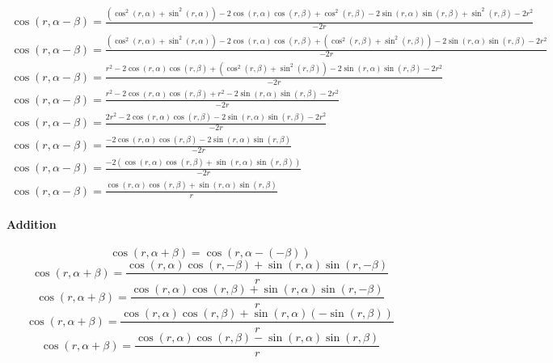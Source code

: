 \documentclass[a4paper,12pt]{report}
\begin{document}
\begin{landscape}
{\begin{gather}
\cos(r,\alpha - \beta) = \frac{\left(\cos^2(r,\alpha) + \sin^2(r,\alpha)\right) - 2 \cos(r,\alpha) \cos(r,\beta) + \cos^2(r,\beta) - 2 \sin(r,\alpha) \sin(r,\beta) + \sin^2(r,\beta) - 2r^2}{-2r} \\
\cos(r,\alpha - \beta) = \frac{\left(\cos^2(r,\alpha) + \sin^2(r,\alpha)\right) - 2 \cos(r,\alpha) \cos(r,\beta) + \left(\cos^2(r,\beta) + \sin^2(r,\beta)\right) - 2 \sin(r,\alpha) \sin(r,\beta) - 2r^2}{-2r} \\
\cos(r,\alpha - \beta) = \frac{r^2 - 2 \cos(r,\alpha) \cos(r,\beta) + \left(\cos^2(r,\beta) + \sin^2(r,\beta)\right) - 2 \sin(r,\alpha) \sin(r,\beta) - 2r^2}{-2r} \\
\cos(r,\alpha - \beta) = \frac{r^2 - 2 \cos(r,\alpha) \cos(r,\beta) + r^2 - 2 \sin(r,\alpha) \sin(r,\beta) - 2r^2}{-2r} \\
\cos(r,\alpha - \beta) = \frac{2r^2 - 2 \cos(r,\alpha) \cos(r,\beta) - 2 \sin(r,\alpha) \sin(r,\beta) - 2r^2}{-2r} \\
\cos(r,\alpha - \beta) = \frac{-2 \cos(r,\alpha) \cos(r,\beta) - 2 \sin(r,\alpha) \sin(r,\beta)}{-2r} \\
\cos(r,\alpha - \beta) = \frac{-2 \left(\cos(r,\alpha) \cos(r,\beta) + \sin(r,\alpha) \sin(r,\beta)\right)}{-2r} \\
\cos(r,\alpha - \beta) = \frac{\cos(r,\alpha) \cos(r,\beta) + \sin(r,\alpha) \sin(r,\beta)}{r}
\end{gather}
}
\end{landscape}
\paragraph{Addition}
\begin{equation}
\cos(r,\alpha + \beta) = \cos(r,\alpha - (-\beta))
\end{equation}
\begin{equation}
\cos(r,\alpha + \beta) = \frac{\cos(r,\alpha) \cos(r,-\beta) + \sin(r,\alpha) \sin(r,-\beta)}{r}
\end{equation}
\begin{equation}
\cos(r,\alpha + \beta) = \frac{\cos(r,\alpha) \cos(r,\beta) + \sin(r,\alpha) \sin(r,-\beta)}{r}
\end{equation}
\begin{equation}
\cos(r,\alpha + \beta) = \frac{\cos(r,\alpha) \cos(r,\beta) + \sin(r,\alpha) (-\sin(r,\beta))}{r}
\end{equation}
\begin{equation}
\cos(r,\alpha + \beta) = \frac{\cos(r,\alpha) \cos(r,\beta) - \sin(r,\alpha) \sin(r,\beta)}{r}
\end{equation}
\end{document}
